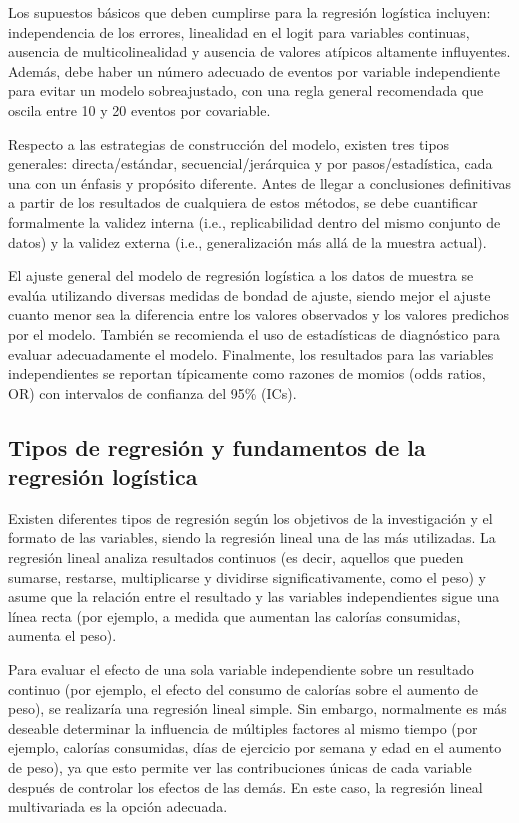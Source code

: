\documentclass[12pt]{article}
\begin{document}
Los supuestos b\'asicos que deben cumplirse para la regresi\'on log\'istica incluyen: independencia de los errores, linealidad en el logit para variables continuas, ausencia de multicolinealidad y ausencia de valores at\'ipicos altamente influyentes. Adem\'as, debe haber un n\'umero adecuado de eventos por variable independiente para evitar un modelo sobreajustado, con una regla general recomendada que oscila entre 10 y 20 eventos por covariable.

Respecto a las estrategias de construcci\'on del modelo, existen tres tipos generales: directa/est\'andar, secuencial/jer\'arquica y por pasos/estad\'istica, cada una con un \'enfasis y prop\'osito diferente. Antes de llegar a conclusiones definitivas a partir de los resultados de cualquiera de estos m\'etodos, se debe cuantificar formalmente la validez interna (i.e., replicabilidad dentro del mismo conjunto de datos) y la validez externa (i.e., generalizaci\'on m\'as all\'a de la muestra actual).

El ajuste general del modelo de regresi\'on log\'istica a los datos de muestra se eval\'ua utilizando diversas medidas de bondad de ajuste, siendo mejor el ajuste cuanto menor sea la diferencia entre los valores observados y los valores predichos por el modelo. Tambi\'en se recomienda el uso de estad\'isticas de diagn\'ostico para evaluar adecuadamente el modelo. Finalmente, los resultados para las variables independientes se reportan t\'ipicamente como razones de momios (odds ratios, OR) con intervalos de confianza del 95\% (ICs).

\subsection{Tipos de regresi\'on y fundamentos de la regresi\'on log\'istica}

Existen diferentes tipos de regresi\'on seg\'un los objetivos de la investigaci\'on y el formato de las variables, siendo la regresi\'on lineal una de las m\'as utilizadas. La regresi\'on lineal analiza resultados continuos (es decir, aquellos que pueden sumarse, restarse, multiplicarse y dividirse significativamente, como el peso) y asume que la relaci\'on entre el resultado y las variables independientes sigue una l\'inea recta (por ejemplo, a medida que aumentan las calor\'ias consumidas, aumenta el peso).

Para evaluar el efecto de una sola variable independiente sobre un resultado continuo (por ejemplo, el efecto del consumo de calor\'ias sobre el aumento de peso), se realizar\'ia una regresi\'on lineal simple. Sin embargo, normalmente es m\'as deseable determinar la influencia de m\'ultiples factores al mismo tiempo (por ejemplo, calor\'ias consumidas, d\'ias de ejercicio por semana y edad en el aumento de peso), ya que esto permite ver las contribuciones \'unicas de cada variable despu\'es de controlar los efectos de las dem\'as. En este caso, la regresi\'on lineal multivariada es la opci\'on adecuada.
\end{document}
